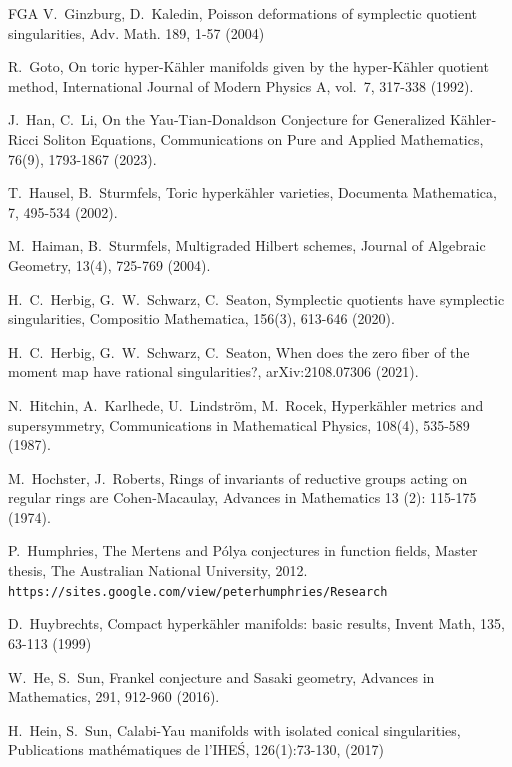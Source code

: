 \documentclass[12pt,a4paper]{amsart}
\theoremstyle{remark}
\theoremstyle{definition}
\begin{document}
\begin{thebibliography}{FGA}
V.~Ginzburg, D.~Kaledin, 
Poisson deformations of symplectic quotient 
singularities, Adv. Math. 189, 1-57 (2004)

R.~Goto, On toric hyper-K\"ahler manifolds given by the hyper-K\"ahler 
quotient method, International Journal of Modern Physics A, vol.\ 7, 
317-338 (1992). 

J.~Han, C.~Li, On the Yau‐Tian‐Donaldson Conjecture for Generalized K\"ahler‐Ricci Soliton Equations, 
Communications on Pure and Applied Mathematics, 76(9), 1793-1867 (2023). 

T.~Hausel, B.~Sturmfels,
Toric hyperk\"ahler varieties, 
Documenta Mathematica, 7, 495-534 (2002). 

M.~Haiman, B.~Sturmfels, 
Multigraded Hilbert schemes, 
Journal of Algebraic Geometry, 13(4), 725-769 (2004). 

H.~C.~Herbig, G.~W.~Schwarz, C.~Seaton,  Symplectic quotients have symplectic singularities, Compositio Mathematica, 156(3), 613-646 (2020). 

H.~C.~Herbig, G.~W.~Schwarz, C.~Seaton,  When does the zero fiber of the moment map have rational singularities?, arXiv:2108.07306 (2021). 

N.~Hitchin, A.~Karlhede, U.~Lindstr\"om, 
M.~Rocek, 
Hyperk\"ahler metrics and supersymmetry, 
Communications in Mathematical Physics, 
108(4), 535-589 (1987). 

M.~Hochster, J.~Roberts, Rings of invariants of reductive groups acting on 
regular rings are Cohen-Macaulay, 
Advances in Mathematics 13 (2): 115-175 (1974). 

P.~Humphries, 
The Mertens and P\'olya conjectures in function fields, 
Master thesis, The Australian National University, 2012. 
{\texttt{https://sites.google.com/view/peterhumphries/Research}}

D.~Huybrechts, 
Compact hyperk\"ahler manifolds: basic results, Invent Math, 135, 63-113 (1999)


W.~He, S.~Sun, Frankel conjecture and Sasaki geometry,  Advances in Mathematics, 291, 912-960 (2016). 

H.~Hein, S.~Sun, 
Calabi-Yau manifolds with isolated conical singularities, Publications math\'ematiques de l'IHE\'S, 126(1):73-130, (2017)


\end{thebibliography}
\end{document}
